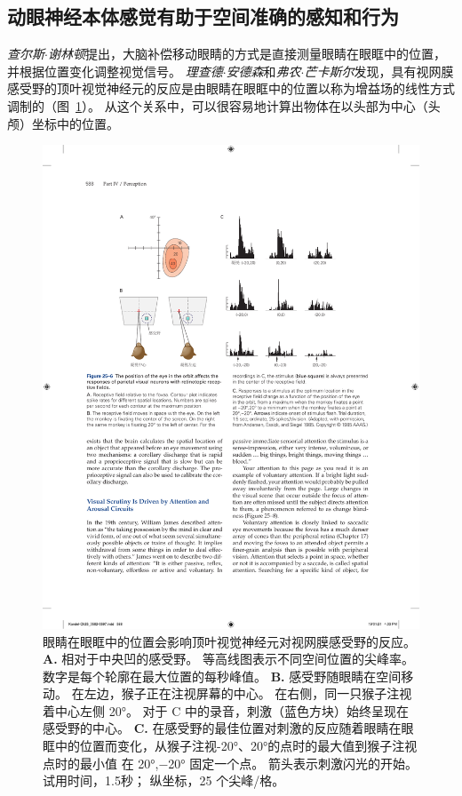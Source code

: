 \subsection{动眼神经本体感觉有助于空间准确的感知和行为}

\textit{查尔斯$\cdot$谢林顿}提出，大脑补偿移动眼睛的方式是直接测量眼睛在眼眶中的位置，并根据位置变化调整视觉信号。
\textit{理查德$\cdot$安德森}和\textit{弗农$\cdot$芒卡斯尔}发现，具有视网膜感受野的顶叶视觉神经元的反应是由眼睛在眼眶中的位置以称为增益场的线性方式调制的（图~\ref{fig:25_6}）。
从这个关系中，可以很容易地计算出物体在以头部为中心（头颅）坐标中的位置。


\begin{figure}[htbp]
	\centering
	\includegraphics[width=0.9\linewidth]{chap25/fig_25_6}
	\caption{眼睛在眼眶中的位置会影响顶叶视觉神经元对视网膜感受野的反应。
		\textbf{A.} 相对于中央凹的感受野。 等高线图表示不同空间位置的尖峰率。
		数字是每个轮廓在最大位置的每秒峰值。
		\textbf{B.} 感受野随眼睛在空间移动。
		在左边，猴子正在注视屏幕的中心。
		在右侧，同一只猴子注视着中心左侧 20°。
		对于 C 中的录音，刺激（蓝色方块）始终呈现在感受野的中心。 
		\textbf{C.} 在感受野的最佳位置对刺激的反应随着眼睛在眼眶中的位置而变化，从猴子注视-20°、20°的点时的最大值到猴子注视点时的最小值 在 20°,−20° 固定一个点。
		箭头表示刺激闪光的开始。
		试用时间，1.5秒； 纵坐标，25 个尖峰/格\cite{andersen1985encoding}。}
	\label{fig:25_6}
\end{figure}


